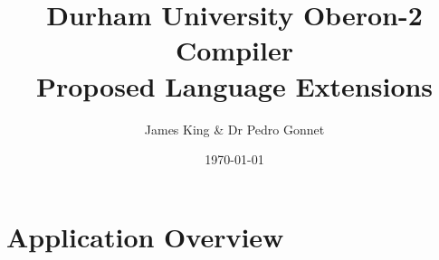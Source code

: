\documentclass[a4paper,11pt]{article}
\title{\centering Durham University Oberon-2 Compiler \\ Proposed Language Extensions}
\date{\today}
\author{James King \& Dr Pedro Gonnet}
\begin{document}
    \maketitle

    \section{Application Overview}
    \lipsum[1-5]
\end{document}
